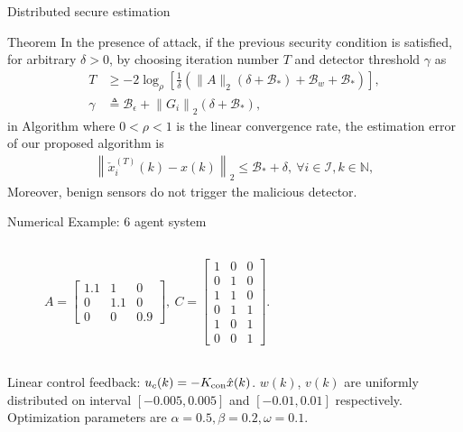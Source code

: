 \documentclass[10pt]{beamer}
\newcommand{\Bc}{{\mathcal B}}
\newcommand{\Ica}{{\mathcal I}}
\newcommand{\Nb}{{\mathbb N}}
\newcommand{\cx}{{\check{x}}}
\begin{document}
\begin{frame}{Distributed secure estimation}

	\begin{block}{Theorem}
	In the presence of attack, if the previous security condition is satisfied, for arbitrary $\delta>0$, by choosing iteration number $T$ and detector threshold $\gamma$ as 
	\begin{align}
		T&\geq -2\log_{\rho}\left[ \frac{1}{\delta} \left( \|A\|_2(\delta+\Bc_{*})+\Bc_{w}+ \Bc_{*} \right)\right], \label{eq:chooseT}\\
		\gamma&\triangleq\Bc_\epsilon + \left\|G_i\right\|_2 (\delta+\Bc_{*}), \label{eq:choose_gamma}
	\end{align}
	in Algorithm where $0<\rho<1$ is the linear convergence rate, the estimation error of our proposed algorithm is
	\begin{align*}
		\left\|\cx_i^{(T)}(k)-x(k)\right\|_2 \leq \Bc_{*}+\delta, \ \forall i\in\Ica, k\in\Nb,
	\end{align*}
	Moreover, benign sensors do not trigger the malicious detector.
	
	\end{block}


	
\end{frame}

\begin{frame}{Numerical Example: 6 agent system}
	\begin{columns}
		\begin{column}{0.5\textwidth}
				\begin{align*}
				A=\begin{bmatrix}
					1.1  &   1  &  0\\
					0 & 1.1  &    0\\
					0  &   0  &  0.9
				\end{bmatrix},\  C=
				\begin{bmatrix}
					1 &0& 0\\
					0& 1& 0\\
					1& 1& 0\\
					0 &1& 1\\
					1& 0& 1\\
					0 &0& 1
				\end{bmatrix}.
			\end{align*}
		\end{column}
	\begin{column}{0.5\textwidth}
		\begin{figure}[htpb!]
			\centering
			
		\end{figure}
	\end{column}
	\end{columns}\vspace{20pt}
Linear control feedback: $u_c(k)=-K_{\rm con}\hat{x}(k)$. $w(k)$, $v(k)$ are uniformly distributed on interval $[-0.005,0.005]$ and $[-0.01,0.01]$ respectively. Optimization parameters are $\alpha=0.5,\beta=0.2,\omega=0.1$.
\end{frame}
\end{document}
